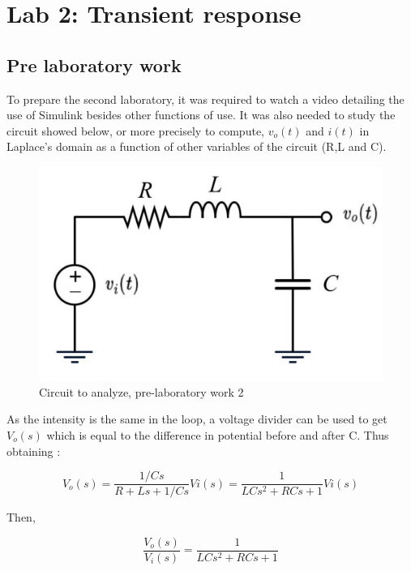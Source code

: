 \documentclass[a4paper,12pt]{article}
\begin{document}
\newpage


\section{Lab 2: Transient response}


\vspace{1cm}

\subsection{Pre laboratory work}
\vspace{0.5cm}

To prepare the second laboratory, it was required to watch a video detailing the use of Simulink besides other functions of use. It was also needed to study the circuit showed below, or more precisely to compute, $v_o(t)$ and $i(t)$ in Laplace's domain as a function of other variables of the circuit (R,L and C).

\vspace{0.5cm}

\begin{figure}[H]
    \centering
    \includegraphics[width=0.5\linewidth]{circuit_lab_2.png}
    \caption{Circuit to analyze, pre-laboratory work 2}
    \label{fig:enter-label}
\end{figure}

\vspace{0.5cm}

As the intensity is the same in the loop, a voltage divider can be used to get $V_o(s)$ which is equal to the difference in potential before and after C. Thus obtaining :

\[V_o(s)= \frac{1/Cs}{R+Ls+1/Cs}Vi(s)= \frac{1}{LCs^2+RCs+1 }Vi(s)\]

Then, 

\begin{equation} 
\frac{V_o(s)}{V_i(s)}=\frac{1}{LCs^2+RCs+1 }
\end{equation}

\vspace{0.5cm}
\end{document}
